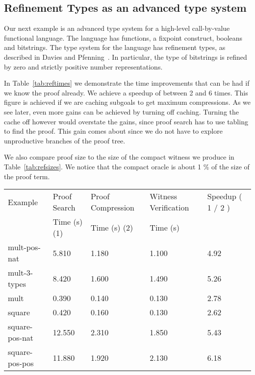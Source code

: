 \documentclass{llncs}
\begin{document}
\subsection{Refinement Types as an advanced type system}
Our next example is an advanced type system for a high-level
call-by-value functional language. The language has functions, a
fixpoint construct, booleans and bitstrings. The type system for the
language has refinement types, as described in Davies and
Pfenning~\cite{davies+:intersection}. In particular, the type of
bitstrings is refined by zero and strictly positive number
representations.

In Table~\ref{tab:reftimes} we demonstrate the time improvements that
can be had if we know the proof already. We achieve a speedup of
between 2 and 6 times. This figure is achieved if we are caching
subgoals to get maximum compressions. As we see later, even more gains
can be achieved by turning off caching. Turning the cache off however
would overstate the gains, since proof search has to use tabling to
find the proof. This gain comes about since we do not have to explore 
unproductive branches of the proof tree.

We also compare proof size to the size of the compact witness we
produce in Table~\ref{tab:refsizes}. We notice that the compact oracle
is about 1 \% of the size of the proof term.

\begin{table*}[htbp]
\begin{center}
\begin{small}
\begin{tabular}{|l|l|l|l|l|}
\hline
Example & Proof Search & Proof Compression 
& Witness Verification & Speedup ( 1 / 2 )\\
& Time (s) (1) & Time (s) (2) & Time (s) & \\
\hline
mult-pos-nat & 5.810 & 1.180 & 1.100 & 4.92 \\
mult-3-types & 8.420 & 1.600 & 1.490 & 5.26 \\
mult & 0.390 & 0.140 & 0.130 & 2.78 \\
square & 0.420 & 0.160 & 0.130 & 2.62 \\
square-pos-nat & 12.550 & 2.310 & 1.850 & 5.43 \\
square-pos-pos & 11.880 & 1.920 & 2.130 & 6.18 \\
\hline
\end{tabular}
\end{small}
\end{center}
\caption{\label{tab:reftimes} Refinement Type System : 
Proof Compression Times with Caching}
\end{table*}
\end{document}
